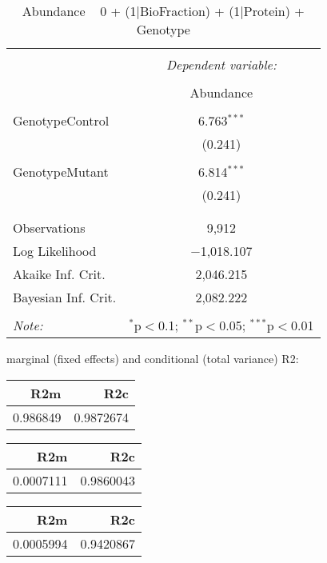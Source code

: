 \documentclass[11pt]{report}
\begin{document}
\begin{table}[!htbp] \centering 
  \caption{Abundance ~ 0 + (1|BioFraction) + (1|Protein) + Genotype} 
  \label{} 
\begin{tabular}{@{\extracolsep{5pt}}lc} 
\\[-1.8ex]\hline 
\hline \\[-1.8ex] 
 & \multicolumn{1}{c}{\textit{Dependent variable:}} \\ 
\cline{2-2} 
\\[-1.8ex] & Abundance \\ 
\hline \\[-1.8ex] 
 GenotypeControl & 6.763$^{***}$ \\ 
  & (0.241) \\ 
  & \\ 
 GenotypeMutant & 6.814$^{***}$ \\ 
  & (0.241) \\ 
  & \\ 
\hline \\[-1.8ex] 
Observations & 9,912 \\ 
Log Likelihood & $-$1,018.107 \\ 
Akaike Inf. Crit. & 2,046.215 \\ 
Bayesian Inf. Crit. & 2,082.222 \\ 
\hline 
\hline \\[-1.8ex] 
\textit{Note:}  & \multicolumn{1}{r}{$^{*}$p$<$0.1; $^{**}$p$<$0.05; $^{***}$p$<$0.01} \\ 
\end{tabular} 
\end{table} 
marginal (fixed effects) and conditional (total variance) R2:

\begin{tabular}{r|r}
\hline
R2m & R2c\\
\hline
0.986849 & 0.9872674\\
\hline
\end{tabular}

\begin{tabular}{r|r}
\hline
R2m & R2c\\
\hline
0.0007111 & 0.9860043\\
\hline
\end{tabular}

\begin{tabular}{r|r}
\hline
R2m & R2c\\
\hline
0.0005994 & 0.9420867\\
\hline
\end{tabular}
\end{document}
